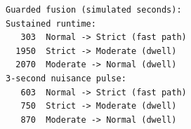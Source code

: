\begin{verbatim}
Guarded fusion (simulated seconds):
Sustained runtime:
   303  Normal -> Strict (fast path)
  1950  Strict -> Moderate (dwell)
  2070  Moderate -> Normal (dwell)
3-second nuisance pulse:
   603  Normal -> Strict (fast path)
   750  Strict -> Moderate (dwell)
   870  Moderate -> Normal (dwell)
\end{verbatim}
